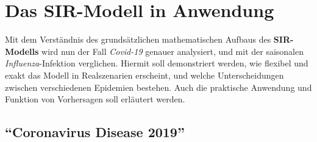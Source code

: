 \documentclass[12pt]{scrartcl} %
\begin{document}








\section{Das SIR-Modell in Anwendung}

Mit dem Verständnis des grundsätzlichen mathematischen Aufbaus des \textbf{SIR-Modells} wird nun der Fall \textsl{Covid-19} genauer analysiert, und mit der saisonalen \textsl{Influenza}-Infektion verglichen. Hiermit soll demonstriert werden, wie flexibel und exakt das Modell in Realszenarien erscheint, und welche Unterscheidungen zwischen verschiedenen Epidemien bestehen. Auch die praktische Anwendung und Funktion von Vorhersagen soll erläutert werden.


\subsection{"`Coronavirus Disease 2019"'}
\end{document}
